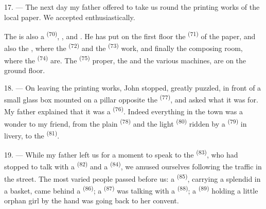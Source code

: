 \VUsaut{3.0mm}

17. --- The next day my father offered to take us round the printing works of the local paper.
We accepted enthusiastically.

The  is also a  \textsuperscript{(70)},
,  and . He has put on
the first floor the  \textsuperscript{(71)} of the paper, and also
the , where the  \textsuperscript{(72)} and the
 \textsuperscript{(73)} work, and finally the composing room, where
the  \textsuperscript{(74)} are. The 
\textsuperscript{(75)} proper, the  and the various machines, are on
the ground floor.

\VUsaut{3.0mm}

18. --- On leaving the printing works, John stopped, greatly puzzled, in front of a small
glass box mounted on a pillar opposite the
 \textsuperscript{(77)}, and asked what it was for. My father
explained that it was a  \textsuperscript{(76)}. Indeed everything in the
town was a wonder to my friend, from the plain
 \textsuperscript{(78)} and the light
 \textsuperscript{(80)} ridden by a 
\textsuperscript{(79)} in livery, to the  \textsuperscript{(81)}.

19. --- While my father left us for a moment to speak to the
 \textsuperscript{(83)}, who had stopped to talk with a
 \textsuperscript{(82)} and a  \textsuperscript{(84)}, we amused
ourselves following the traffic in the street. The most varied people passed before us: a
 \textsuperscript{(85)}, carrying a splendid  in a
basket, came behind a  \textsuperscript{(86)}; a 
\textsuperscript{(87)} was talking with a
 \textsuperscript{(88)}; a  \textsuperscript{(89)} holding a little
orphan girl by the hand was going back to her convent.

\VUsaut{3.0mm}

